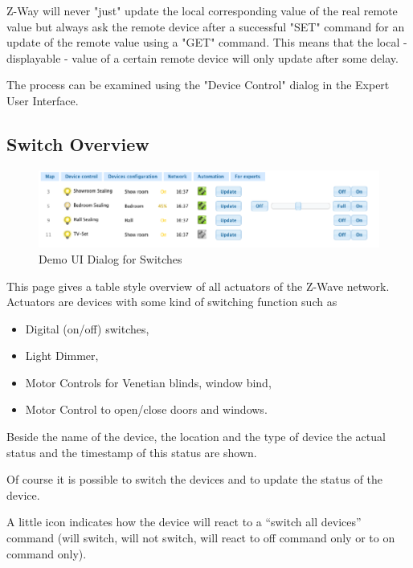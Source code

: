 Z-Way will never "just" update the local corresponding value of the real remote value but always ask the remote device after a successful "SET"  command for 
an update of the remote value using a "GET" command.  This means that the local  - displayable - value of a certain remote device will only update after some delay.

The process can be examined using the "Device Control" dialog in the Expert User Interface.

 
\subsection{Switch Overview}



\begin{figure} 
\begin{center}
\includegraphics[scale=0.8]{pics/switches.png}
\caption{Demo UI Dialog for Switches}
\label{c3:demosen} 
\end{center}
 \end{figure}
This page gives a table style overview of all actuators of the Z-Wave network. Actuators are devices with some kind of switching function such as 

\begin{itemize}
\item Digital (on/off) switches, 
\item Light Dimmer, 
\item Motor Controls for Venetian blinds, window bind,
\item Motor Control to open/close doors and windows.
\end{itemize}

Beside the name of the device, the location and the type of device the actual status and the timestamp of this status are shown.

Of course it is possible to switch the devices and to update the status of the device.

A little icon indicates how the device will react to a “switch all devices” command  (will switch, will 
not switch, will react to off command only or to on command only).

